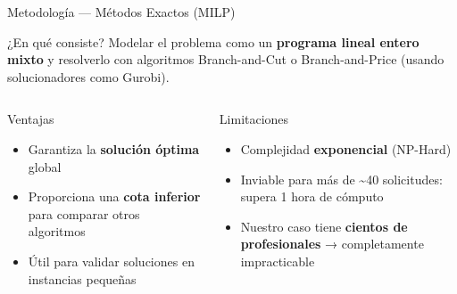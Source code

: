 \documentclass[10pt, aspectratio=169]{beamer}
\begin{document}
\begin{frame}{Metodología — Métodos Exactos (MILP)}

  \begin{block}{¿En qué consiste?}
    Modelar el problema como un \textbf{programa lineal entero mixto} y resolverlo con algoritmos Branch-and-Cut o Branch-and-Price (usando solucionadores como Gurobi).
  \end{block}

  \vspace{8pt}
  \begin{columns}[T]
      \begin{exampleblock}{\textcolor{verdeok}{Ventajas}}
        \begin{itemize}\setlength\itemsep{5pt}
          \item Garantiza la \textbf{solución óptima} global
          \item Proporciona una \textbf{cota inferior} para comparar otros algoritmos
          \item Útil para validar soluciones en instancias pequeñas
        \end{itemize}
      \end{exampleblock}

      \begin{alertblock}{\textcolor{rojono}{Limitaciones}}
        \begin{itemize}\setlength\itemsep{5pt}
          \item Complejidad \textbf{exponencial} (NP-Hard)
          \item Inviable para más de \textasciitilde{}40 solicitudes: supera 1 hora de cómputo
          \item Nuestro caso tiene \textbf{cientos de profesionales} → completamente impracticable
        \end{itemize}
      \end{alertblock}
  \end{columns}

\end{frame}
\end{document}
